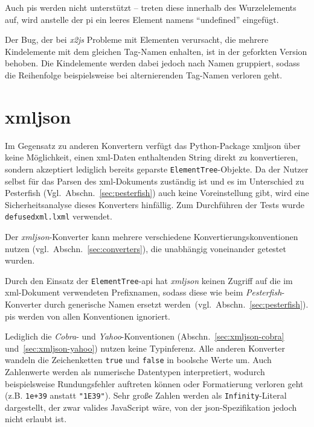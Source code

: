 Auch \glspl{pi} werden nicht unterstützt -- treten diese innerhalb des Wurzelelements auf, wird anstelle der \gls{pi} ein leeres Element namens \enquote{undefined} eingefügt.

Der Bug, der bei \emph{x2js} Probleme mit Elementen verursacht, die mehrere Kindelemente mit dem gleichen Tag-Namen enhalten, ist in der geforkten Version behoben. Die Kindelemente werden dabei jedoch nach Namen gruppiert, sodass die Reihenfolge beispielsweise bei alternierenden Tag-Namen verloren geht.

\section{xmljson}
\label{sec:xmljson}

Im Gegensatz zu anderen Konvertern verfügt das Python-Package xmljson über keine Möglichkeit, einen \acrshort{xml}-Daten enthaltenden String direkt zu konvertieren, sondern akzeptiert lediglich bereits geparste \texttt{ElementTree}-Objekte. Da der Nutzer selbst für das Parsen des \acrshort{xml}-Dokuments zuständig ist und es im Unterschied zu Pesterfish (Vgl.~Abschn.~\ref{sec:pesterfish}) auch keine Voreinstellung gibt, wird eine Sicherheitsanalyse dieses Konverters hinfällig. Zum Durchführen der Tests wurde \texttt{defusedxml.lxml} verwendet.

Der \emph{xmljson}-Konverter kann mehrere verschiedene Konvertierungskonventionen nutzen (vgl.~Abschn.~\ref{sec:converters}), die unabhängig voneinander getestet wurden.

Durch den Einsatz der \texttt{ElementTree}-\acrshort{api} hat \emph{xmljson} keinen Zugriff auf die im \acrshort{xml}-Dokument verwendeten Prefixnamen, sodass diese wie beim \emph{Pesterfish}-Konverter durch generische Namen ersetzt werden~(vgl.~Abschn.~\ref{sec:pesterfish}).
\glspl{pi} werden von allen Konventionen ignoriert.

Lediglich die \emph{Cobra}- und \emph{Yahoo}-Konventionen (Abschn.~\ref{sec:xmljson-cobra} und~\ref{sec:xmljson-yahoo}) nutzen keine Typinferenz. Alle anderen Konverter wandeln die Zeichenketten \texttt{true} und \texttt{false} in boolsche Werte um. Auch Zahlenwerte werden als numerische Datentypen interpretiert, wodurch beispielsweise Rundungsfehler auftreten können oder Formatierung verloren geht (z.B. \texttt{1e+39} anstatt \texttt{"1E39"}). Sehr große Zahlen werden als \texttt{Infinity}-Literal dargestellt, der zwar valides JavaScript wäre, von der \acrshort{json}-Spezifikation jedoch nicht erlaubt ist.

